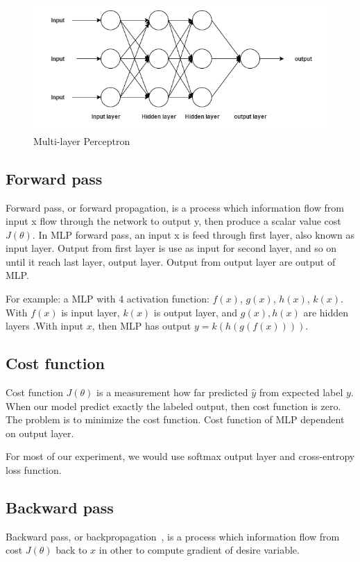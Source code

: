 \begin{figure}[H]
	\centering
	\includegraphics[width=0.7\linewidth]{figure/multilayerperceptron}
	\caption[Multi-layer Perceptron]{Multi-layer Perceptron}
	\label{fig:multilayerperceptron}
\end{figure}

\subsection{Forward pass}
Forward pass, or forward propagation, is a process which information flow from input x flow through the network to output y, then produce a scalar value cost $J(\theta)$. In MLP forward pass, an input x is feed through first layer, also known as input layer. Output from first layer is use as input for second layer, and so on until it reach last layer, output layer. Output from output layer are output of MLP.

For example: a MLP with 4 activation function: $f(x)$, $g(x)$, $h(x)$, $k(x)$. With $f(x)$ is input layer, $k(x)$ is output layer, and $g(x), h(x)$ are hidden layers .With input $x$, then MLP has output $ y = k(h(g(f(x))))$.

\subsection{Cost function}
Cost function $J(\theta)$  is a measurement how far predicted  $\hat y$ from expected label $y$. When our model predict exactly the labeled output, then cost function is zero. The problem is to minimize the cost function. Cost function of MLP dependent on output layer.

For most of our experiment, we would use softmax output layer and cross-entropy loss function.

\subsection{Backward pass}
Backward pass, or backpropagation~\cite{rumelhart1988learning}, is a process which information flow from cost $J(\theta)$ back to $x$ in other to compute gradient of desire variable.


